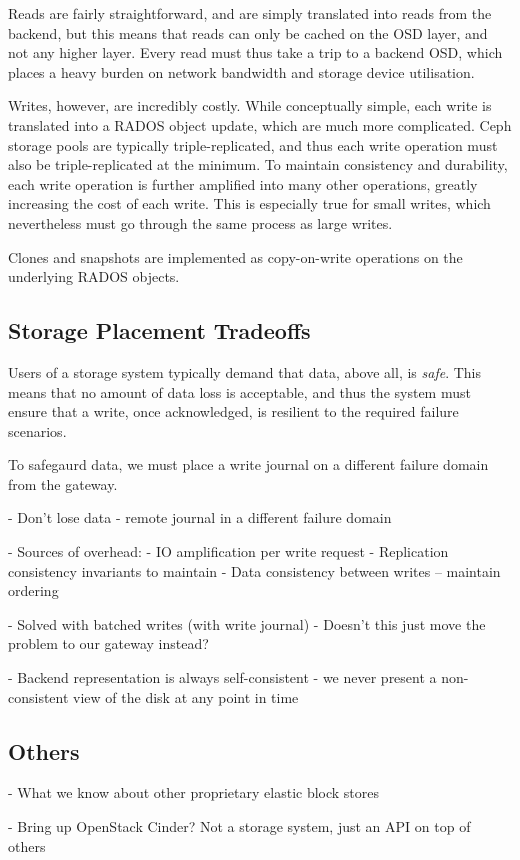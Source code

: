 Reads are fairly straightforward, and are simply translated into reads from the
backend, but this means that reads can only be cached on the OSD layer, and
not any higher layer. Every read must thus take a trip to a backend OSD, which
places a heavy burden on network bandwidth and storage device utilisation.

Writes, however, are incredibly costly. While conceptually simple, each write is
translated into a RADOS object update, which are much more complicated.  Ceph
storage pools are typically triple-replicated, and thus each write operation
must also be triple-replicated at the minimum. To maintain consistency and
durability, each write operation is further amplified into many other
operations, greatly increasing the cost of each write. This is especially true
for small writes, which nevertheless must go through the same process as large
writes. 

Clones and snapshots are implemented as copy-on-write operations on the
underlying RADOS objects.

\subsection{Storage Placement Tradeoffs}

Users of a storage system typically demand that data, above all, is
\textit{safe}.  This means that no amount of data loss is acceptable, and thus
the system must ensure that a write, once acknowledged, is resilient to the
required failure scenarios.

To safegaurd data, we must place a write journal on a different failure domain
from the gateway.

- Don't lose data - remote journal in a different failure domain

- Sources of overhead:
- IO amplification per write request
- Replication consistency invariants to maintain
- Data consistency between writes -- maintain ordering

- Solved with batched writes (with write journal)
- Doesn't this just move the problem to our gateway instead?

- Backend representation is always self-consistent - we never present a non-consistent
view of the disk at any point in time

\subsection{Others}

- What we know about other proprietary elastic block stores

- Bring up OpenStack Cinder? Not a storage system, just an API on top of others
